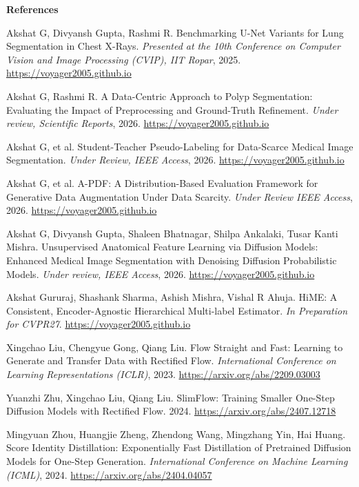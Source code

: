 \documentclass[12pt]{article}
\begin{document}
{\footnotesize
\textbf{References}
\begin{enumerate}[leftmargin=1.3em, itemsep=1pt, label={[\arabic*]}]
\item \label{ref3} Akshat G, Divyansh Gupta, Rashmi R. Benchmarking U-Net Variants for Lung Segmentation in Chest X-Rays. \emph{Presented at the 10th Conference on Computer Vision and Image Processing (CVIP), IIT Ropar}, 2025. \url{https://voyager2005.github.io}
\item \label{ref4} Akshat G, Rashmi R. A Data-Centric Approach to Polyp Segmentation: Evaluating the Impact of Preprocessing and Ground-Truth Refinement. \emph{Under review, Scientific Reports}, 2026. \url{https://voyager2005.github.io}
\item \label{ref5} Akshat G, et al. Student-Teacher Pseudo-Labeling for Data-Scarce Medical Image Segmentation. \emph{Under Review, IEEE Access}, 2026. \url{https://voyager2005.github.io}
\item \label{ref6} Akshat G, et al. A-PDF: A Distribution-Based Evaluation Framework for Generative Data Augmentation Under Data Scarcity. \emph{Under Review IEEE Access}, 2026. \url{https://voyager2005.github.io}
\item \label{ref7} Akshat G, Divyansh Gupta, Shaleen Bhatnagar, Shilpa Ankalaki, Tusar Kanti Mishra. Unsupervised Anatomical Feature Learning via Diffusion Models: Enhanced Medical Image Segmentation with Denoising Diffusion Probabilistic Models. \emph{Under review, IEEE Access}, 2026. \url{https://voyager2005.github.io}
\item \label{ref8} Akshat Gururaj, Shashank Sharma, Ashish Mishra, Vishal R Ahuja. HiME: A Consistent, Encoder-Agnostic Hierarchical Multi-label Estimator. \emph{In Preparation for CVPR27}. \url{https://voyager2005.github.io}
\item \label{ref9} Xingchao Liu, Chengyue Gong, Qiang Liu. Flow Straight and Fast: Learning to Generate and Transfer Data with Rectified Flow. \emph{International Conference on Learning Representations (ICLR)}, 2023. \url{https://arxiv.org/abs/2209.03003}
\item \label{ref10} Yuanzhi Zhu, Xingchao Liu, Qiang Liu. SlimFlow: Training Smaller One-Step Diffusion Models with Rectified Flow. 2024. \url{https://arxiv.org/abs/2407.12718}
\item \label{ref11} Mingyuan Zhou, Huangjie Zheng, Zhendong Wang, Mingzhang Yin, Hai Huang. Score Identity Distillation: Exponentially Fast Distillation of Pretrained Diffusion Models for One-Step Generation. \emph{International Conference on Machine Learning (ICML)}, 2024. \url{https://arxiv.org/abs/2404.04057}
\end{enumerate}
}
\end{document}
